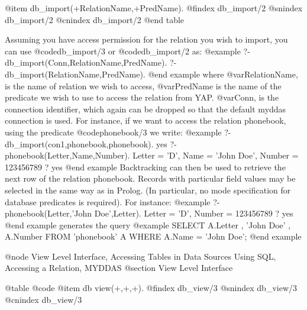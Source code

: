 @item db_import(+RelationName,+PredName).  
@findex db_import/2
@snindex db_import/2
@cnindex db_import/2
@end table

Assuming you have access permission for the relation you wish to import,
you can use @code{db_import/3} or @code{db_import/2} as:
@example
?- db_import(Conn,RelationName,PredName).
?- db_import(RelationName,PredName).
@end example
 where @var{RelationName}, is the name of
relation we wish to access, @var{PredName} is the name of the predicate we
wish to use to access the relation from YAP. @var{Conn}, is the connection
identifier, which again can be dropped so that the default myddas connection
is used. For instance, if we want to access the relation phonebook,
using the predicate @code{phonebook/3} we write: 
@example
?- db_import(con1,phonebook,phonebook). 
yes
?- phonebook(Letter,Name,Number).
Letter = 'D',
Name = 'John Doe',
Number = 123456789 ? 
yes
@end example
Backtracking can then be used to retrieve the next row
of the relation phonebook.  Records with particular field values may be
selected in the same way as in Prolog. (In particular, no mode
specification for database predicates is required). For instance: 
@example
?- phonebook(Letter,'John Doe',Letter). 
Letter = 'D', 
Number = 123456789 ?
yes
@end example
generates the query
@example
SELECT A.Letter , 'John Doe' , A.Number 
FROM 'phonebook' A 
WHERE A.Name = 'John Doe';
@end example

@node View Level Interface, Accessing Tables in Data Sources Using SQL, Accessing a Relation, MYDDAS
@section View Level Interface

@table @code
@item db view(+,+,+).
@findex db_view/3
@snindex db_view/3
@cnindex db_view/3

